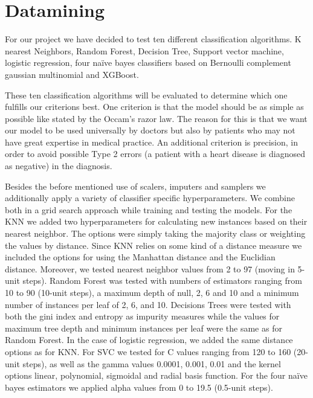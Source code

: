 \section{Datamining} \label{sec:datamining}

For our project we have decided to test ten different classification algorithms. K nearest Neighbors, Random Forest, Decision Tree, Support vector machine, logistic regression, four naïve bayes classifiers based on Bernoulli complement gaussian multinomial and XGBoost. 

These ten classification algorithms will be evaluated to determine which one fulfills our criterions best. One criterion is that the model should be as simple as possible like stated by the Occam’s razor law. The reason for this is that we want our model to be used universally by doctors but also by patients who may not have great expertise in medical practice. An additional criterion is precision, in order to avoid possible Type 2 errors (a patient with a heart disease is diagnosed as negative) in the diagnosis.   

Besides the before mentioned use of scalers, imputers and samplers we additionally apply a variety of classifier specific hyperparameters. We combine both in a grid search approach while training and testing the models. For the KNN we added two hyperparameters for calculating new instances based on their nearest neighbor. The options were simply taking the majority class or weighting the values by distance. Since KNN relies on some kind of a distance measure we included the options for using the Manhattan distance and the Euclidian distance. Moreover, we tested nearest neighbor values from 2 to 97 (moving in 5-unit steps). Random Forest was tested with numbers of estimators ranging from 10 to 90 (10-unit steps), a maximum depth of null, 2, 6 and 10 and a minimum number of instances per leaf of 2, 6, and 10. Decisions Trees were tested with both the gini index and entropy as impurity measures while the values for maximum tree depth and minimum instances per leaf were the same as for Random Forest. In the case of logistic regression, we added the same distance options as for KNN. For SVC we tested for C values ranging from 120 to 160 (20-unit steps), as well as the gamma values 0.0001, 0.001, 0.01 and the kernel options linear, polynomial, sigmoidal and radial basis function. For the four naïve bayes estimators we applied alpha values from 0 to 19.5 (0.5-unit steps). 

